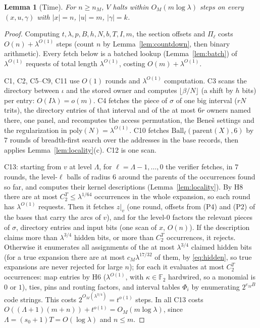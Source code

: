 \documentclass[11pt]{article}
\newtheorem{lemma}[theorem]{Lemma}
\theoremstyle{definition}
\theoremstyle{remark}
\newcommand{\F}{\mathbb F}
\newcommand{\Ball}{\mathrm{Ball}}
\begin{document}
\begin{lemma}[Time]\label{lem:time}
For $n\ge n_M$, $V$ halts within $O_M(m\log\lambda)$ steps on every $(x,u,\gamma)$ with $|x|=n$, $|u|=m$, $|\gamma|=k$.
\end{lemma}
\begin{proof}
Computing $t,\lambda,p,B,h,N,b,T,I,m$, the section offsets and $\Pi_\ell$ costs $O(n)+\lambda^{O(1)}$ steps (count $n$ by
Lemma~\ref{lem:countdown}, then binary arithmetic). Every fetch below is a batched lookup (Lemma~\ref{lem:batch}) of
$\lambda^{O(1)}$ requests of total length $\lambda^{O(1)}$, costing $O(m)+\lambda^{O(1)}$.

C1, C2, C5--C9, C11 use $O(1)$ rounds and $\lambda^{O(1)}$ computation. C3 scans the directory between $\iota$ and the stored owner
and computes $\lfloor\beta/N\rfloor$ (a shift by $h$ bits) per entry: $O(I\lambda)=o(m)$. C4 fetches the piece of $\sigma$ of one big
interval ($rN$ trits), the directory entries of that interval and of the at most $6r$ owners named there, one panel, and recomputes the access permutation, the Bene\v{s} settings and the
regularization in $\mathrm{poly}(N)=\lambda^{O(1)}$. C10 fetches $\Ball_\ell(\mathrm{parent}(X),6)$ by $7$ rounds of breadth-first
search over the addresses in the base records, then applies Lemma~\ref{lem:locality}(c). C12 is one scan.

C13: starting from $v$ at level $\Lambda$, for $\ell=\Lambda-1,\dots,0$ the verifier fetches, in $7$ rounds, the level-$\ell$ balls of
radius $6$ around the parents of the occurrences found so far, and computes their kernel descriptions (Lemma~\ref{lem:locality}). By
H8 there are at most $C_2^T\le\lambda^{1/64}$ occurrences in the whole expansion, so each round has $\lambda^{O(1)}$ requests. Then
it fetches $z|_v$ (one round, offsets from (P4) and (P2) of the bases that carry the arcs of $v$), and for the level-$0$ factors
the relevant pieces of $\sigma$, directory entries and input bits (one scan of $x$, $O(n)$). If the description claims more than
$\lambda^{3/4}$ hidden bits, or more than $C_2^T$ occurrences, it rejects. Otherwise it enumerates all assignments of the at most
$\lambda^{3/4}$ claimed hidden bits (for a true expansion there are at most $c_M\lambda^{17/32}$ of them, by \eqref{eq:hidden}, so
true expansions are never rejected for large $n$); for each it evaluates at most $C_2^T$ occurrences: map entries by H6
($\lambda^{O(1)}$, with $\kappa\in\F_2$ hardwired, so a monomial is $0$ or $1$), ties, pins and routing factors, and interval tables
$\Phi_i$ by enumerating $2^{e_MB}$ code strings. This costs $2^{O_M(\lambda^{3/4})}=t^{o(1)}$ steps. In all C13 costs
$O((\Lambda+1)(m+n))+t^{o(1)}=O_M(m\log\lambda)$, since $\Lambda=(s_0+1)T=O(\log\lambda)$ and $n\le m$.
\end{proof}
\end{document}
